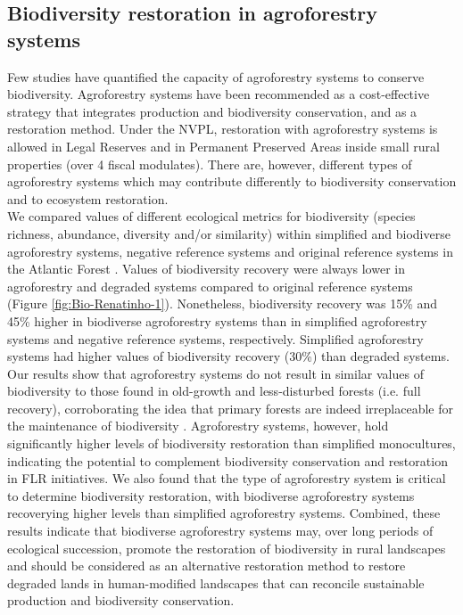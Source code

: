 \newpage
\subsection{\large Biodiversity restoration in agroforestry systems} \label{subsec:bio-recovery-SAF} 

Few studies have quantified the capacity of agroforestry systems to conserve biodiversity. Agroforestry systems have been recommended as a cost-effective strategy that integrates production and biodiversity conservation, and as a restoration method. Under the NVPL, restoration with agroforestry systems is allowed in Legal Reserves and in Permanent Preserved Areas inside small rural properties (over 4 fiscal modulates). There are, however, different types of agroforestry systems \citep{ MiccolisAndrewPeneireiroFabianaMongeliMarquesHenriqueRodriguesVieiraDanielLuisMasciaArco-VerdeMarceloFrancioHoffmannMauricioRigonRehderTatianaPereira2016} which may contribute differently to biodiversity conservation and to ecosystem restoration. \\
\indent We compared values of different ecological metrics for biodiversity (species richness, abundance, diversity and/or similarity) within simplified and biodiverse agroforestry systems, negative reference systems and original reference systems in the Atlantic Forest \citep{Santos2019}. Values of biodiversity recovery were always lower in agroforestry and degraded systems compared to original reference systems (Figure \ref{fig:Bio-Renatinho-1}). Nonetheless, biodiversity recovery was 15\% and 45\% higher in biodiverse agroforestry systems than in simplified agroforestry systems and negative reference systems, respectively. Simplified agroforestry systems had higher values of biodiversity recovery (30\%) than degraded systems. \\
\indent Our results show that agroforestry systems do not result in similar values of biodiversity to those found in old-growth and less-disturbed forests (i.e. full recovery), corroborating the idea that primary forests are indeed irreplaceable for the maintenance of biodiversity \citep{Gibson2011, Crouzeilles2016a}. Agroforestry systems, however, hold significantly higher levels of biodiversity restoration than simplified monocultures, indicating the potential to complement biodiversity conservation and restoration in FLR initiatives. We also found that the type of agroforestry system is critical to determine biodiversity restoration, with biodiverse agroforestry systems recoverying higher levels than simplified agroforestry systems. Combined, these results indicate that biodiverse agroforestry systems may, over long periods of ecological succession, promote the restoration of biodiversity in rural landscapes and should be considered as an alternative restoration method to restore degraded lands in human-modified landscapes that can reconcile sustainable production and biodiversity conservation. 


